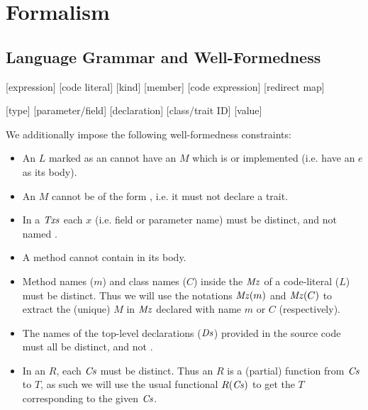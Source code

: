 \section{Formalism}
\subsection{Language Grammar and Well-Formedness}
\newcommand{\foo}[1]{\ensuremath{#1 \atop \mathit{#1}}}
\noindent


\noindent
\newlength{\gramwidth}
\setlength{\gramwidth}{\dimexpr\textwidth-1em}
\begin{minipage}[t]{0.6\gramwidth}
\begin{grammar}
	[expression]
	[code literal]
	[kind]
	[member]
	[code expression]
	[redirect map]
\end{grammar}
\end{minipage}\hfil
\begin{minipage}[t]{0.4\gramwidth}
\begin{grammar}
	[type]
	[parameter/field]
	[declaration]
	[class/trait ID]
	[value]
	\\
\end{grammar}
\end{minipage}

We additionally impose the following well-formedness constraints:
\begin{itemize}
	\item An $L$ marked as an \interface cannot have an $M$ which is \static or implemented (i.e. have an $e$ as its body).
	\item An $M$ cannot be of the form , i.e. it must not declare a trait.
	\item In a $\mathit{Txs}$ each $x$ (i.e. field or parameter name) must be distinct, and not named \this. 
	\item A \static method cannot contain \this in its body.
	\item Method names ($m$) and class names ($C$) inside the $\mathit{Mz}$ of a code-literal ($L$) must be distinct. Thus we will use the notations $\mathit{Mz}(m)$ and $\mathit{Mz}(C)$ to extract the (unique) $M$ in $\mathit{Mz}$ declared with name $m$ or $C$ (respectively).
	
	\item The names of the top-level declarations ($\mathit{Ds}$) provided in the source code must all be distinct, and not \This.
	\item In an $R$, each $\mathit{Cs}$ must be distinct. Thus an $R$ is a (partial) function from $\mathit{Cs}$ to $T$, as such we will use the usual functional $R(\mathit{Cs})$ to get the $T$ corresponding to the given $\mathit{Cs}$.
\end{itemize}


